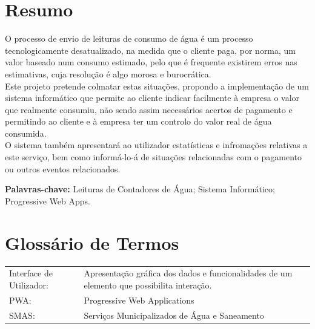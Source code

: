 \documentclass[a4paper,openright,twoside,11pt]{report}
\begin{document}
\chapter*{Resumo}
O processo de envio de leituras de consumo de água é um processo tecnologicamente desatualizado, na medida que o cliente paga, por norma, um valor baseado num consumo estimado, pelo que é frequente existirem erros nas estimativas, cuja resolução é algo morosa e burocrática.\\
Este projeto pretende colmatar estas situações, propondo a implementação de um sistema informático que permite ao cliente indicar facilmente à empresa o valor que realmente consumiu, não sendo assim necessários acertos de pagamento e permitindo ao cliente e à empresa ter um controlo do valor real de água consumida.\\
O sistema também apresentará ao utilizador estatísticas e infromações relativas a este serviço, bem como informá-lo-á de situações relacionadas com o pagamento ou outros eventos relacionados.
\vspace{1.5cm}

{\bf Palavras-chave:} Leituras de Contadores de Água; Sistema Informático; Progressive Web Apps.

\cleardoublepage %
\chapter*{Glossário de Termos}

\begin{tabular}[l]{l  p{11cm}} 

Interface de Utilizador: & Apresentação gráfica dos dados e funcionalidades de um elemento que possibilita interação.\\ 

PWA:  & Progressive Web Applications\\

SMAS: & Serviços Municipalizados de Água e Saneamento\\

\end{tabular}
\label{tab:req_utilizador}

\end{document}
